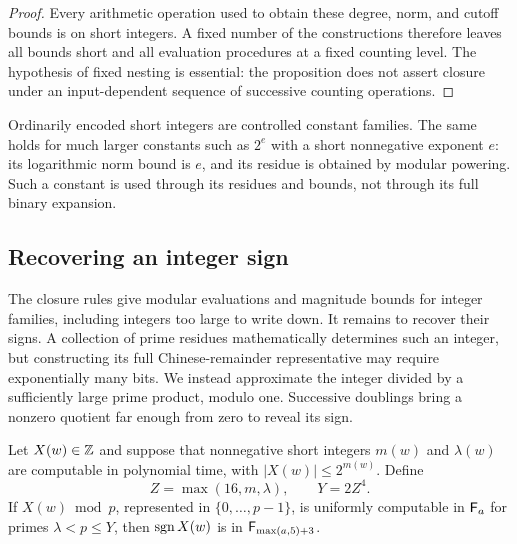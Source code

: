 \begin{proof}
Every arithmetic operation used to obtain these degree, norm, and
cutoff bounds is on short integers.  A fixed number of the constructions
therefore leaves all bounds short and all evaluation procedures at a
fixed counting level.  The hypothesis of fixed nesting is essential:
the proposition does not assert closure under an input-dependent
sequence of successive counting operations.
\end{proof}

Ordinarily encoded short integers are controlled constant families.
The same holds for much larger constants such as $2^e$ with a short
nonnegative exponent $e$: its logarithmic norm bound is $e$, and its
residue is obtained by modular powering.  Such a constant is used
through its residues and bounds, not through its full binary expansion.

\subsection{Recovering an integer sign}

The closure rules give modular evaluations and magnitude bounds for
integer families, including integers too large to write down.  It
remains to recover their signs.  A collection of prime residues
mathematically determines such an integer, but constructing its full
Chinese-remainder representative may require exponentially many bits.
We instead approximate the integer divided by a sufficiently large
prime product, modulo one.  Successive doublings bring a nonzero
quotient far enough from zero to reveal its sign.

\begin{proposition}\label{prop:crt-sign}
Let $X(w)\in\mathbb Z$ and suppose that nonnegative short integers $m(w)$ and
$\lambda(w)$ are computable in polynomial time, with
$|X(w)|\le2^{m(w)}$.  Define
\begin{equation}\label{eq:crt-bounds}
 Z=\max(16,m,\lambda),\qquad Y=2Z^4.
\end{equation}
If $X(w)\bmod p$, represented in $\{0,\ldots,p-1\}$, is uniformly
computable in $\mathsf F_{a}$ for primes $\lambda<p\le Y$, then
$\operatorname{sgn} X(w)$ is in $\mathsf F_{\max(a,5)+3}$.
\end{proposition}

